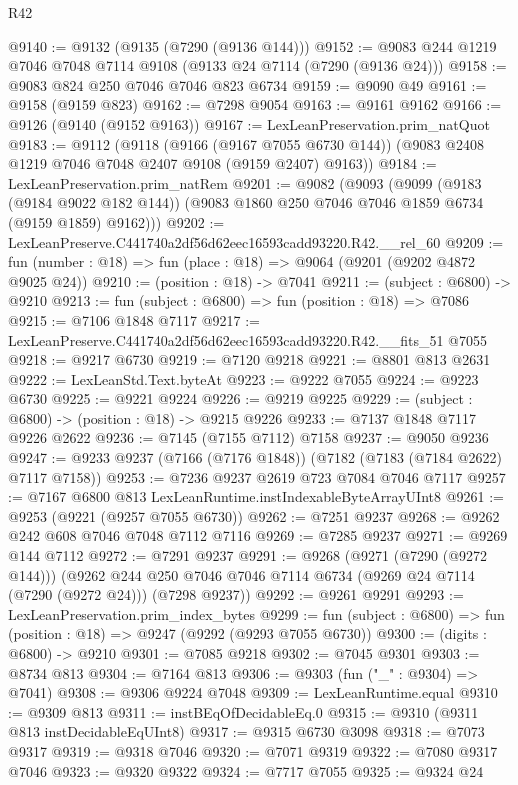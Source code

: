 \begin{lexlean}{R42}
\begin{coremodule}
{@9140 := @9132 (@9135 (@7290 (@9136 @144)))
@9152 := @9083 @244 @1219 @7046 @7048 @7114 @9108 (@9133 @24 @7114 (@7290 (@9136 @24)))
@9158 := @9083 @824 @250 @7046 @7046 @823 @6734
@9159 := @9090 @49
@9161 := @9158 (@9159 @823)
@9162 := @7298 @9054
@9163 := @9161 @9162
@9166 := @9126 (@9140 (@9152 @9163))
@9167 := LexLeanPreservation.prim_natQuot
@9183 := @9112
    (@9118
      (@9166 (@9167 @7055 @6730 @144))
      (@9083 @2408 @1219 @7046 @7048 @2407 @9108 (@9159 @2407) @9163))
@9184 := LexLeanPreservation.prim_natRem
@9201 := @9082
    (@9093
      (@9099
        (@9183 (@9184 @9022 @182 @144))
        (@9083 @1860 @250 @7046 @7046 @1859 @6734 (@9159 @1859) @9162)))
@9202 := LexLeanPreserve.C441740a2df56d62eec16593cadd93220.R42.__rel_60
@9209 := fun (number : @18) => fun (place : @18) => @9064 (@9201 (@9202 @4872 @9025 @24))
@9210 := (position : @18) -> @7041
@9211 := (subject : @6800) -> @9210
@9213 := fun (subject : @6800) => fun (position : @18) => @7086
@9215 := @7106 @1848 @7117
@9217 := LexLeanPreserve.C441740a2df56d62eec16593cadd93220.R42.__fits_51 @7055
@9218 := @9217 @6730
@9219 := @7120 @9218
@9221 := @8801 @813 @2631
@9222 := LexLeanStd.Text.byteAt
@9223 := @9222 @7055
@9224 := @9223 @6730
@9225 := @9221 @9224
@9226 := @9219 @9225
@9229 := (subject : @6800) -> (position : @18) -> @9215 @9226
@9233 := @7137 @1848 @7117 @9226 @2622
@9236 := @7145 (@7155 @7112) @7158
@9237 := @9050 @9236
@9247 := @9233 @9237 (@7166 (@7176 @1848)) (@7182 (@7183 (@7184 @2622) @7117 @7158))
@9253 := @7236 @9237 @2619 @723 @7084 @7046 @7117
@9257 := @7167 @6800 @813 LexLeanRuntime.instIndexableByteArrayUInt8
@9261 := @9253 (@9221 (@9257 @7055 @6730))
@9262 := @7251 @9237
@9268 := @9262 @242 @608 @7046 @7048 @7112 @7116
@9269 := @7285 @9237
@9271 := @9269 @144 @7112
@9272 := @7291 @9237
@9291 := @9268
    (@9271 (@7290 (@9272 @144)))
    (@9262 @244 @250 @7046 @7046 @7114 @6734 (@9269 @24 @7114 (@7290 (@9272 @24))) (@7298 @9237))
@9292 := @9261 @9291
@9293 := LexLeanPreservation.prim_index_bytes
@9299 := fun (subject : @6800) => fun (position : @18) => @9247 (@9292 (@9293 @7055 @6730))
@9300 := (digits : @6800) -> @9210
@9301 := @7085 @9218
@9302 := @7045 @9301
@9303 := @8734 @813
@9304 := @7164 @813
@9306 := @9303 (fun ("_" : @9304) => @7041)
@9308 := @9306 @9224 @7048
@9309 := LexLeanRuntime.equal
@9310 := @9309 @813
@9311 := instBEqOfDecidableEq.{0}
@9315 := @9310 (@9311 @813 instDecidableEqUInt8)
@9317 := @9315 @6730 @3098
@9318 := @7073 @9317
@9319 := @9318 @7046
@9320 := @7071 @9319
@9322 := @7080 @9317 @7046
@9323 := @9320 @9322
@9324 := @7717 @7055
@9325 := @9324 @24
}
\end{coremodule}
\end{lexlean}
